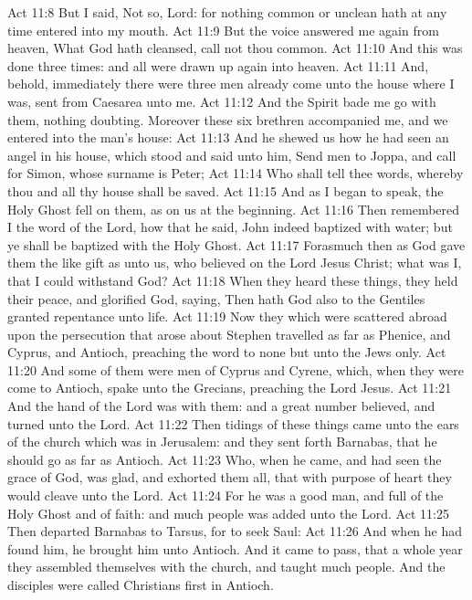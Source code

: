 \vs Act 11:8 But I said, Not so, Lord: for nothing common or unclean hath at any time entered into my mouth.
\vs Act 11:9 But the voice answered me again from heaven, What God hath cleansed,  call not thou common.
\vs Act 11:10 And this was done three times: and all were drawn up again into heaven.
\vs Act 11:11 And, behold, immediately there were three men already come unto the house where I was, sent from Caesarea unto me.
\vs Act 11:12 And the Spirit bade me go with them, nothing doubting. Moreover these six brethren accompanied me, and we entered into the man's house:
\vs Act 11:13 And he shewed us how he had seen an angel in his house, which stood and said unto him, Send men to Joppa, and call for Simon, whose surname is Peter;
\vs Act 11:14 Who shall tell thee words, whereby thou and all thy house shall be saved.
\vs Act 11:15 And as I began to speak, the Holy Ghost fell on them, as on us at the beginning.
\vs Act 11:16 Then remembered I the word of the Lord, how that he said, John indeed baptized with water; but ye shall be baptized with the Holy Ghost.
\vs Act 11:17 Forasmuch then as God gave them the like gift as  unto us, who believed on the Lord Jesus Christ; what was I, that I could withstand God?
\vs Act 11:18 When they heard these things, they held their peace, and glorified God, saying, Then hath God also to the Gentiles granted repentance unto life.
\vs Act 11:19 Now they which were scattered abroad upon the persecution that arose about Stephen travelled as far as Phenice, and Cyprus, and Antioch, preaching the word to none but unto the Jews only.
\vs Act 11:20 And some of them were men of Cyprus and Cyrene, which, when they were come to Antioch, spake unto the Grecians, preaching the Lord Jesus.
\vs Act 11:21 And the hand of the Lord was with them: and a great number believed, and turned unto the Lord.
\vs Act 11:22 Then tidings of these things came unto the ears of the church which was in Jerusalem: and they sent forth Barnabas, that he should go as far as Antioch.
\vs Act 11:23 Who, when he came, and had seen the grace of God, was glad, and exhorted them all, that with purpose of heart they would cleave unto the Lord.
\vs Act 11:24 For he was a good man, and full of the Holy Ghost and of faith: and much people was added unto the Lord.
\vs Act 11:25 Then departed Barnabas to Tarsus, for to seek Saul:
\vs Act 11:26 And when he had found him, he brought him unto Antioch. And it came to pass, that a whole year they assembled themselves with the church, and taught much people. And the disciples were called Christians first in Antioch.
